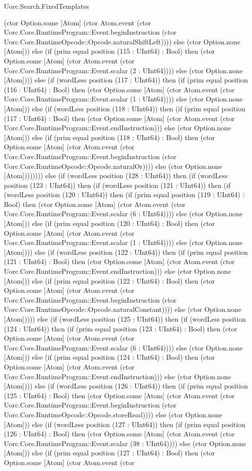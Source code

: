 \begin{lexlean}{Uorc.Search.FixedTemplates}
\begin{semanticmodule}
{(ctor Option.some [Atom] (ctor Atom.event (ctor Uorc.Core.RuntimeProgram::Event.beginInstruction (ctor Uorc.Core.RuntimeOpcode::Opcode.naturalShiftLeft)))) else (ctor Option.none [Atom])) else (if (prim equal position (115 : UInt64) : Bool) then (ctor Option.some [Atom] (ctor Atom.event (ctor Uorc.Core.RuntimeProgram::Event.scalar (2 : UInt64)))) else (ctor Option.none [Atom]))) else (if (wordLess position (117 : UInt64)) then (if (prim equal position (116 : UInt64) : Bool) then (ctor Option.some [Atom] (ctor Atom.event (ctor Uorc.Core.RuntimeProgram::Event.scalar (1 : UInt64)))) else (ctor Option.none [Atom])) else (if (wordLess position (118 : UInt64)) then (if (prim equal position (117 : UInt64) : Bool) then (ctor Option.some [Atom] (ctor Atom.event (ctor Uorc.Core.RuntimeProgram::Event.endInstruction))) else (ctor Option.none [Atom])) else (if (prim equal position (118 : UInt64) : Bool) then (ctor Option.some [Atom] (ctor Atom.event (ctor Uorc.Core.RuntimeProgram::Event.beginInstruction (ctor Uorc.Core.RuntimeOpcode::Opcode.naturalOr)))) else (ctor Option.none [Atom]))))))) else (if (wordLess position (128 : UInt64)) then (if (wordLess position (123 : UInt64)) then (if (wordLess position (121 : UInt64)) then (if (wordLess position (120 : UInt64)) then (if (prim equal position (119 : UInt64) : Bool) then (ctor Option.some [Atom] (ctor Atom.event (ctor Uorc.Core.RuntimeProgram::Event.scalar (6 : UInt64)))) else (ctor Option.none [Atom])) else (if (prim equal position (120 : UInt64) : Bool) then (ctor Option.some [Atom] (ctor Atom.event (ctor Uorc.Core.RuntimeProgram::Event.scalar (1 : UInt64)))) else (ctor Option.none [Atom]))) else (if (wordLess position (122 : UInt64)) then (if (prim equal position (121 : UInt64) : Bool) then (ctor Option.some [Atom] (ctor Atom.event (ctor Uorc.Core.RuntimeProgram::Event.endInstruction))) else (ctor Option.none [Atom])) else (if (prim equal position (122 : UInt64) : Bool) then (ctor Option.some [Atom] (ctor Atom.event (ctor Uorc.Core.RuntimeProgram::Event.beginInstruction (ctor Uorc.Core.RuntimeOpcode::Opcode.naturalConstant)))) else (ctor Option.none [Atom])))) else (if (wordLess position (125 : UInt64)) then (if (wordLess position (124 : UInt64)) then (if (prim equal position (123 : UInt64) : Bool) then (ctor Option.some [Atom] (ctor Atom.event (ctor Uorc.Core.RuntimeProgram::Event.scalar (6 : UInt64)))) else (ctor Option.none [Atom])) else (if (prim equal position (124 : UInt64) : Bool) then (ctor Option.some [Atom] (ctor Atom.event (ctor Uorc.Core.RuntimeProgram::Event.endInstruction))) else (ctor Option.none [Atom]))) else (if (wordLess position (126 : UInt64)) then (if (prim equal position (125 : UInt64) : Bool) then (ctor Option.some [Atom] (ctor Atom.event (ctor Uorc.Core.RuntimeProgram::Event.beginInstruction (ctor Uorc.Core.RuntimeOpcode::Opcode.storeRead)))) else (ctor Option.none [Atom])) else (if (wordLess position (127 : UInt64)) then (if (prim equal position (126 : UInt64) : Bool) then (ctor Option.some [Atom] (ctor Atom.event (ctor Uorc.Core.RuntimeProgram::Event.scalar (38 : UInt64)))) else (ctor Option.none [Atom])) else (if (prim equal position (127 : UInt64) : Bool) then (ctor Option.some [Atom] (ctor Atom.event (ctor }
\end{semanticmodule}
\end{lexlean}
